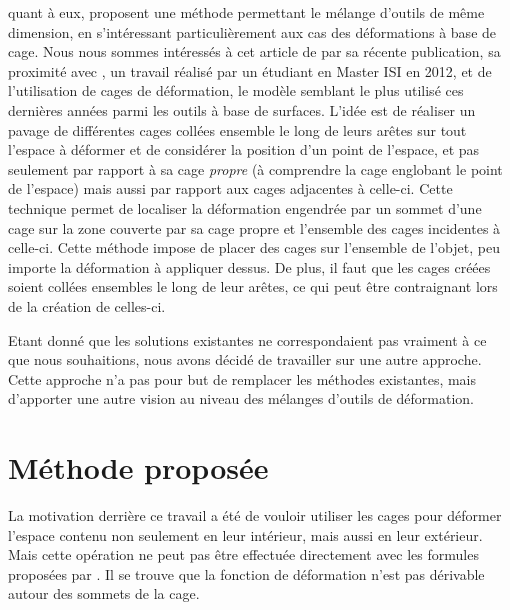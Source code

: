 \cite{GPCP13} quant à eux, proposent une méthode permettant le mélange d'outils
de même dimension, en s'intéressant particulièrement aux cas des déformations à
base de cage. Nous nous sommes intéressés à cet article de par sa récente
publication, sa proximité avec \cite{Hur12}, un travail réalisé par un étudiant
en Master ISI en 2012, et de l'utilisation de cages de déformation, le modèle
semblant le plus utilisé ces dernières années parmi les outils à base de
surfaces. L'idée est de réaliser un pavage de différentes cages collées ensemble
le long de leurs arêtes sur tout l'espace à déformer et de considérer la
position d'un point de l'espace, et pas seulement par rapport à sa cage
\textit{propre} (à comprendre la cage englobant le point de l'espace) mais aussi
par rapport aux cages adjacentes à celle-ci. Cette technique permet de localiser
la déformation engendrée par un sommet d'une cage sur la zone couverte par sa
cage propre et l'ensemble des cages incidentes à celle-ci. Cette méthode impose
de placer des cages sur l'ensemble de l'objet, peu importe la déformation à
appliquer dessus. De plus, il faut que les cages créées soient collées
ensembles le long de leur arêtes, ce qui peut être contraignant lors de la
création de celles-ci.

Etant donné que les solutions existantes ne correspondaient pas vraiment à ce
que nous souhaitions, nous avons décidé de travailler sur une autre approche.
Cette approche n'a pas pour but de remplacer les méthodes existantes, mais
d'apporter une autre vision au niveau des mélanges d'outils de déformation.

\section{Méthode proposée}

La motivation derrière ce travail a été de vouloir utiliser les cages pour
déformer l'espace contenu non seulement en leur intérieur, mais aussi en leur
extérieur. Mais cette opération ne peut pas être effectuée directement avec les
formules proposées par \cite{Flo03}. Il se trouve que la fonction de déformation
n'est pas dérivable autour des sommets de la cage.


